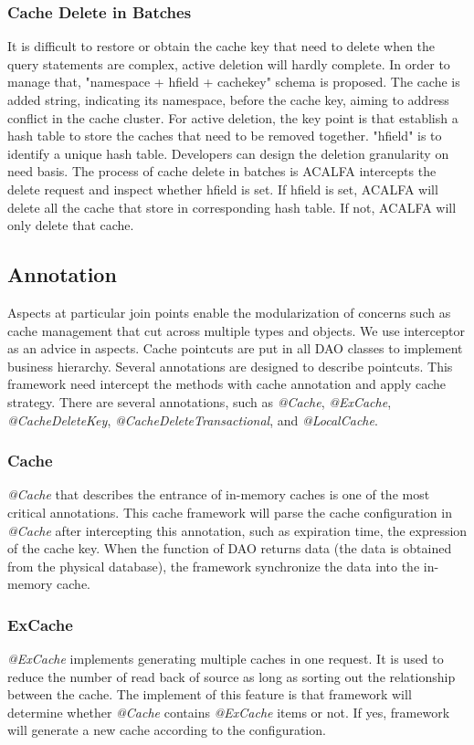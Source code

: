 \documentclass{singlecol-new}
\theoremstyle{TH}{
\newtheorem{lemma}{Lemma}
\newtheorem{theorem}[lemma]{Theorem}
\newtheorem{corrolary}[lemma]{Corrolary}
\newtheorem{conjecture}[lemma]{Conjecture}
\newtheorem{proposition}[lemma]{Proposition}
\newtheorem{claim}[lemma]{Claim}
\newtheorem{stheorem}[lemma]{Wrong Theorem}
}
\theoremstyle{THrm}{
\newtheorem{definition}{Definition}[section]
\newtheorem{question}{Question}[section]
\newtheorem{remark}{Remark}
\newtheorem{scheme}{Scheme}
}
\theoremstyle{THhit}{
\newtheorem{case}{Case}[section]
}
\begin{document}
\subsubsection{Cache Delete in Batches}
It is difficult to restore or obtain the cache key that need to delete when the query statements are complex, active deletion will hardly complete. In order to manage that, "namespace + hfield + cachekey" schema is proposed. The cache is added string, indicating its namespace, before the cache key, aiming to address conflict in the cache cluster. For active deletion, the key point is that establish a hash table to store the caches that need to be removed together. "hfield" is to identify a unique hash table. Developers can design the deletion granularity on need basis. The process of cache delete in batches is ACALFA intercepts the delete request and inspect whether hfield is set. If hfield is set, ACALFA will delete all the cache that store in corresponding hash table. If not, ACALFA will only delete that cache.

\subsection{Annotation}
Aspects at particular join points enable the modularization of concerns such as cache management that cut across multiple types and objects. We use interceptor as an advice in aspects. Cache pointcuts are put in all DAO classes to implement business hierarchy. Several annotations are designed to describe pointcuts. This framework need intercept the methods with cache annotation and apply cache strategy. There are several annotations, such as \textit{@Cache}, \textit{@ExCache}, \textit{@CacheDeleteKey}, \textit{@CacheDeleteTransactional}, and \textit{@LocalCache}.

\subsubsection{Cache}
\textit{@Cache} that describes the entrance of in-memory caches is one of the most critical annotations. This cache framework will parse the cache configuration in \textit{@Cache} after intercepting this annotation, such as expiration time, the expression of the cache key. When the function of DAO returns data (the data is obtained from the physical database), the framework synchronize the data into the in-memory cache.

\subsubsection{ExCache}
\textit{@ExCache} implements generating multiple caches in one request. It is used to reduce the number of read back of source as long as sorting out the relationship between the cache. The implement of this feature is that framework will determine whether \textit{@Cache} contains \textit{@ExCache} items or not. If yes, framework will generate a new cache according to the configuration.
\end{document}
